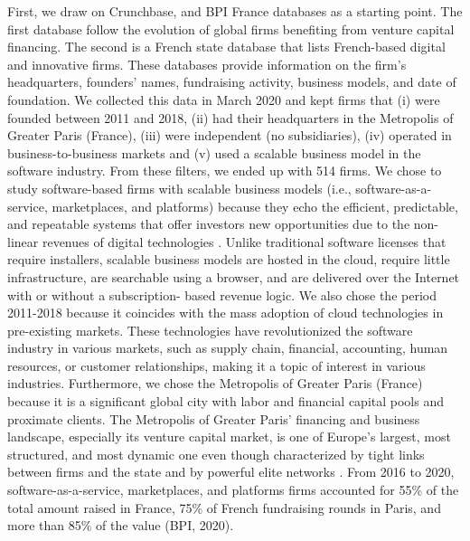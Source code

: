 \documentclass[12pt]{article}
\begin{document}
First, we draw on Crunchbase, and BPI France databases as a starting point. The first database follow the evolution of global firms benefiting from venture capital financing. The second is a French state database that lists French-based digital and innovative firms. These databases provide information on the firm’s headquarters, founders’ names, fundraising activity, business models, and date of foundation. We collected this data in March 2020 and kept firms that (i) were founded between 2011 and 2018, (ii) had their headquarters in the Metropolis of Greater Paris (France), (iii) were independent (no subsidiaries), (iv) operated in business-to-business markets and (v) used a scalable business model in the software industry. From these filters, we ended up with 514 firms. We chose to study software-based firms with scalable business models (i.e., software-as-a-service, marketplaces, and platforms) because they echo the efficient, predictable, and repeatable systems that offer investors new opportunities due to the non-linear revenues of digital technologies \citep{nambisan2017digital}. Unlike traditional software licenses that require installers, scalable business models are hosted in the cloud, require little infrastructure, are searchable using a browser, and are delivered over the Internet with or without a subscription- based revenue logic. We also chose the period 2011-2018 because it coincides with the mass adoption of cloud technologies in pre-existing markets. These technologies have revolutionized the software industry in various markets, such as supply chain, financial, accounting, human resources, or customer relationships, making it a topic of interest in various industries. Furthermore, we chose the Metropolis of Greater Paris (France) because it is a significant global city with labor and financial capital pools and proximate clients. The Metropolis of Greater Paris’ financing and business landscape, especially its venture capital market, is one of Europe’s largest, most structured, and most dynamic one even though  characterized by tight links between firms and the state and by powerful elite networks \citep{milosevic2018skills}. From 2016 to 2020, software-as-a-service, marketplaces, and platforms firms accounted for 55\% of the total amount raised in France, 75\% of French fundraising rounds in Paris, and more than 85\% of the value (BPI, 2020).
\end{document}
